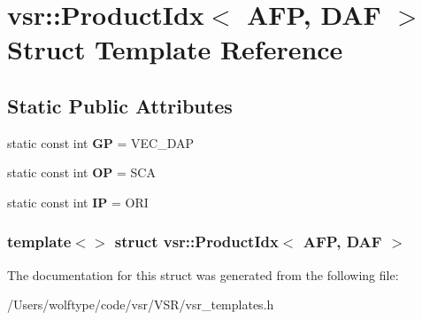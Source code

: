 \hypertarget{structvsr_1_1_product_idx_3_01_a_f_p_00_01_d_a_f_01_4}{\section{vsr\-:\-:Product\-Idx$<$ A\-F\-P, D\-A\-F $>$ Struct Template Reference}
\label{structvsr_1_1_product_idx_3_01_a_f_p_00_01_d_a_f_01_4}
}
\subsection*{Static Public Attributes}
\begin{DoxyCompactItemize}
\item 
\hypertarget{structvsr_1_1_product_idx_3_01_a_f_p_00_01_d_a_f_01_4_a9472e17fee7c07d43d1702f55e1ff866}{static const int {\bfseries G\-P} = V\-E\-C\-\_\-\-D\-A\-P}\label{structvsr_1_1_product_idx_3_01_a_f_p_00_01_d_a_f_01_4_a9472e17fee7c07d43d1702f55e1ff866}

\item 
\hypertarget{structvsr_1_1_product_idx_3_01_a_f_p_00_01_d_a_f_01_4_a394bad2943d1d5deb773f34272ceda70}{static const int {\bfseries O\-P} = S\-C\-A}\label{structvsr_1_1_product_idx_3_01_a_f_p_00_01_d_a_f_01_4_a394bad2943d1d5deb773f34272ceda70}

\item 
\hypertarget{structvsr_1_1_product_idx_3_01_a_f_p_00_01_d_a_f_01_4_ada1507122d9684aa659c64628d1630eb}{static const int {\bfseries I\-P} = O\-R\-I}\label{structvsr_1_1_product_idx_3_01_a_f_p_00_01_d_a_f_01_4_ada1507122d9684aa659c64628d1630eb}

\end{DoxyCompactItemize}
\subsubsection*{template$<$$>$ struct vsr\-::\-Product\-Idx$<$ A\-F\-P, D\-A\-F $>$}



The documentation for this struct was generated from the following file\-:\begin{DoxyCompactItemize}
\item 
/\-Users/wolftype/code/vsr/\-V\-S\-R/vsr\-\_\-templates.\-h\end{DoxyCompactItemize}
